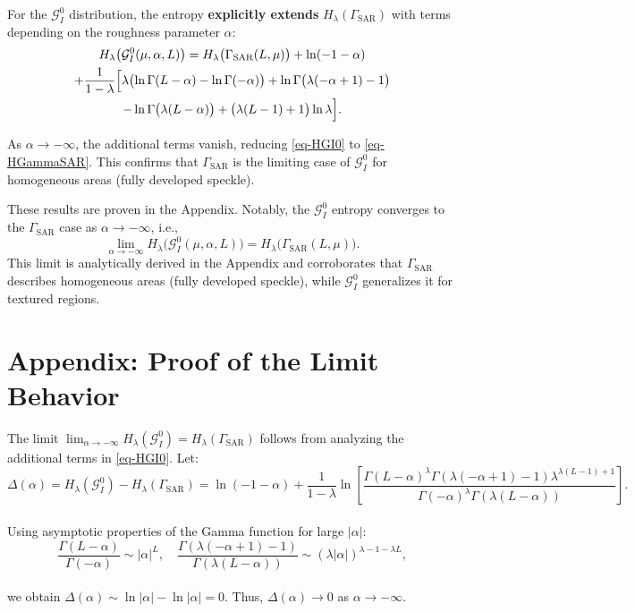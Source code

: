 \documentclass[11pt,]{article}
\begin{document}
For the \(\mathcal{G}^0_I\) distribution, the entropy \textbf{explicitly
extends} \(H_\lambda(\Gamma_{\text{SAR}})\) with terms depending on the
roughness parameter \(\alpha\):\\
\begin{multline}  
\label{eq-HGI0}  
H_\lambda\bigl(\mathcal{G}^0_I(\mu, \alpha, L)\bigr) = H_\lambda\bigl(\Gamma_{\text{SAR}}(L, \mu)\bigr) + \ln(-1 - \alpha) \\  
+ \frac{1}{1 - \lambda} \Bigl[ \lambda\bigl(\ln\Gamma(L - \alpha) - \ln\Gamma(-\alpha)\bigr) + \ln\Gamma\bigl(\lambda(-\alpha + 1) - 1\bigr) \\  
- \ln\Gamma\bigl(\lambda(L - \alpha)\bigr) + \bigl(\lambda(L-1)+1\bigr)\ln\lambda \Bigr].  
\end{multline}

As \(\alpha \to -\infty\), the additional terms vanish, reducing
\eqref{eq-HGI0} to \eqref{eq-HGammaSAR}. This confirms that
\(\Gamma_{\text{SAR}}\) is the limiting case of \(\mathcal{G}^0_I\) for
homogeneous areas (fully developed speckle).

These results are proven in the Appendix. Notably, the
\(\mathcal{G}^0_I\) entropy converges to the \(\Gamma_{\text{SAR}}\)
case as \(\alpha \to -\infty\), i.e., \[
\lim_{\alpha \to -\infty} H_\lambda\bigl(\mathcal{G}^0_I(\mu, \alpha, L)\bigr) = H_\lambda\bigl(\Gamma_{\text{SAR}}(L, \mu)\bigr).
\] This limit is analytically derived in the Appendix and corroborates
that \(\Gamma_{\text{SAR}}\) describes homogeneous areas (fully
developed speckle), while \(\mathcal{G}^0_I\) generalizes it for
textured regions.

\section*{Appendix: Proof of the Limit Behavior}

The limit
\(\lim_{\alpha \to -\infty} H_\lambda(\mathcal{G}^0_I) = H_\lambda(\Gamma_{\text{SAR}})\)
follows from analyzing the additional terms in \eqref{eq-HGI0}. Let:\\
\[
\Delta(\alpha) = H_\lambda(\mathcal{G}^0_I) - H_\lambda(\Gamma_{\text{SAR}}) = \ln(-1-\alpha) + \frac{1}{1-\lambda} \ln\!\left[ \frac{\Gamma(L-\alpha)^\lambda \Gamma(\lambda(-\alpha+1)-1) \lambda^{\lambda(L-1)+1}}{\Gamma(-\alpha)^\lambda \Gamma(\lambda(L-\alpha))} \right].
\]\\
Using asymptotic properties of the Gamma function for large
\(|\alpha|\):\\
\[
\frac{\Gamma(L-\alpha)}{\Gamma(-\alpha)} \sim |\alpha|^L, \quad \frac{\Gamma(\lambda(-\alpha+1)-1)}{\Gamma(\lambda(L-\alpha))} \sim (\lambda|\alpha|)^{\lambda-1 - \lambda L},
\]\\
we obtain \(\Delta(\alpha) \sim \ln|\alpha| - \ln|\alpha| = 0\). Thus,
\(\Delta(\alpha) \to 0\) as \(\alpha \to -\infty\).





\newpage
\singlespacing 

\end{document}

